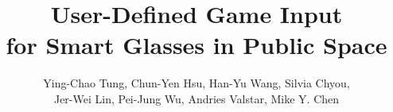 \documentclass{sigchi}
\begin{document}
\title{User-Defined Game Input \\for Smart Glasses in Public Space}


\author{\alignauthor Ying-Chao Tung, Chun-Yen Hsu, Han-Yu Wang, Silvia Chyou,\\Jer-Wei Lin, Pei-Jung Wu, Andries Valstar, Mike Y. Chen\\
 \\ 
}


\maketitle
\end{document}
